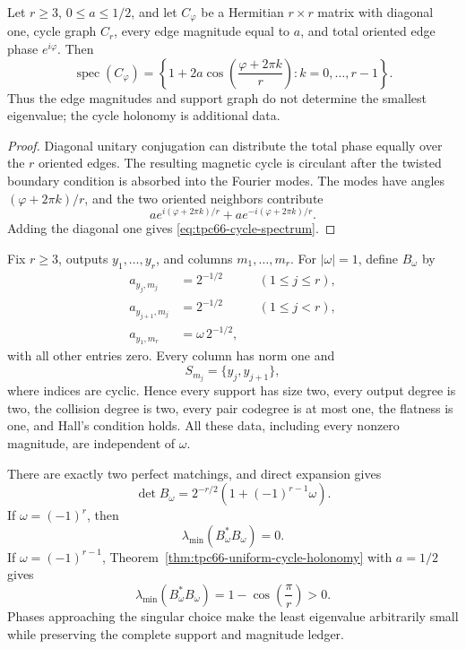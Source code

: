 \begin{theorem}
\label{thm:tpc66-uniform-cycle-holonomy}
Let \(r\ge3\), \(0\le a\le1/2\), and let \(C_\varphi\) be a Hermitian
\(r\times r\) matrix with diagonal one, cycle graph \(C_r\), every edge
magnitude equal to \(a\), and total oriented edge phase
\(e^{i\varphi}\).  Then
\begin{equation}
 \boxed{
 \operatorname{spec}(C_\varphi)
 =
 \left\{
 1+2a\cos\left(\frac{\varphi+2\pi k}{r}\right):
 k=0,\ldots,r-1
 \right\}.}
 \label{eq:tpc66-cycle-spectrum}
\end{equation}
Thus the edge magnitudes and support graph do not determine the smallest
eigenvalue; the cycle holonomy is additional data.
\end{theorem}

\begin{proof}
Diagonal unitary conjugation can distribute the total phase equally over
the \(r\) oriented edges.  The resulting magnetic cycle is circulant after
the twisted boundary condition is absorbed into the Fourier modes.  The
modes have angles
\((\varphi+2\pi k)/r\), and the two oriented neighbors contribute
\[
 ae^{i(\varphi+2\pi k)/r}
 +ae^{-i(\varphi+2\pi k)/r}.
\]
Adding the diagonal one gives \eqref{eq:tpc66-cycle-spectrum}.
\end{proof}

\begin{example}
\label{ex:tpc66-cycle-countermodel}
Fix \(r\ge3\), outputs \(y_1,\ldots,y_r\), and columns
\(m_1,\ldots,m_r\).  For \(|\omega|=1\), define \(B_\omega\) by
\begin{align}
 a_{y_j,m_j}&=2^{-1/2}
 &&(1\le j\le r),\nonumber\\
 a_{y_{j+1},m_j}&=2^{-1/2}
 &&(1\le j<r),\nonumber\\
 a_{y_1,m_r}&=\omega\,2^{-1/2},
 \label{eq:tpc66-cycle-incidence}
\end{align}
with all other entries zero.  Every column has norm one and
\[
 S_{m_j}=\{y_j,y_{j+1}\},
\]
where indices are cyclic.  Hence every support has size two, every output
degree is two, the collision degree is two, every pair codegree is at most
one, the flatness is one, and Hall's condition holds.  All these data,
including every nonzero magnitude, are independent of \(\omega\).

There are exactly two perfect matchings, and direct expansion gives
\begin{equation}
 \det B_\omega
 =
 2^{-r/2}
 \left(1+(-1)^{r-1}\omega\right).
 \label{eq:tpc66-cycle-determinant}
\end{equation}
If \(\omega=(-1)^r\), then
\[
 \lambda_{\min}(B_\omega^*B_\omega)=0.
\]
If \(\omega=(-1)^{r-1}\), Theorem~\ref{thm:tpc66-uniform-cycle-holonomy}
with \(a=1/2\) gives
\begin{equation}
 \lambda_{\min}(B_\omega^*B_\omega)
 =
 1-\cos\left(\frac{\pi}{r}\right)>0.
 \label{eq:tpc66-cycle-positive-gap}
\end{equation}
Phases approaching the singular choice make the least eigenvalue
arbitrarily small while preserving the complete support and magnitude
ledger.
\end{example}

